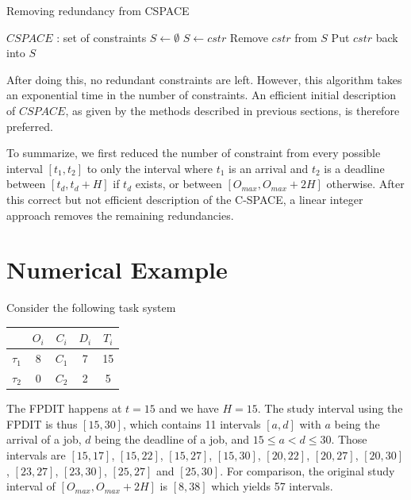 \documentclass[conference]{IEEEtran}
\begin{document}
\begin{algorithm}
\caption{Removing redundancy from CSPACE}
\label{alg:prunRedun}
  \begin{algorithmic}[1]
    \STATE $CSPACE$ : set of constraints
    \STATE $S \leftarrow \emptyset$
    \STATE {}
        \STATE $S \leftarrow cstr$
      \ENDIF
    \ENDFOR
    \STATE {}
      \STATE Remove $cstr$ from $S$
        \STATE Put $cstr$ back into $S$
      \ENDIF
    \ENDFOR
  \end{algorithmic}
\end{algorithm}

After doing this, no redundant constraints are left. However, this algorithm takes an exponential time in the number of constraints. An efficient initial description of $CSPACE$, as given by the methods described in previous sections, is therefore preferred.

To summarize, we first reduced the number of constraint from every possible interval $[t_1, t_2]$ to only the interval where $t_1$ is an arrival and $t_2$ is a deadline between $[t_d, t_d + H]$ if $t_d$ exists, or between $[O_{max}, O_{max} + 2H]$ otherwise. After this correct but not efficient description of the C-SPACE, a linear integer approach removes the remaining redundancies.

\section{Numerical Example}

Consider the following task system

    \begin{center}
    \begin{tabular}{|r|c|c|c|c|}
     \hline
      & $O_i$ & $C_i$ & $D_i$ & $T_i$ \\
     \hline
     $\tau_1$ & 8 & $C_1$ & 7 & 15\\
     \hline
     $\tau_2$ & 0 & $C_2$ & 2 & 5\\
     \hline
    \end{tabular}
    \end{center}

The FPDIT happens at $t=15$ and we have $H = 15$. The study interval using the FPDIT is thus $[15, 30]$, which contains 11 intervals $[a,d]$ with $a$ being the arrival of a job, $d$ being the deadline of a job, and $15 \leqslant a < d \leqslant 30$. Those intervals are
$[15, 17]$, $[15, 22]$, $[15, 27]$, $[15, 30]$, $[20, 22]$, $[20, 27]$, $[20, 30]$, $[23, 27]$, $[23, 30]$, $[25, 27]$ and $[25, 30]$. For comparison, the original study interval of $[O_{max}, O_{max} + 2H]$ is $[8, 38]$ which yields 57 intervals.
\end{document}
